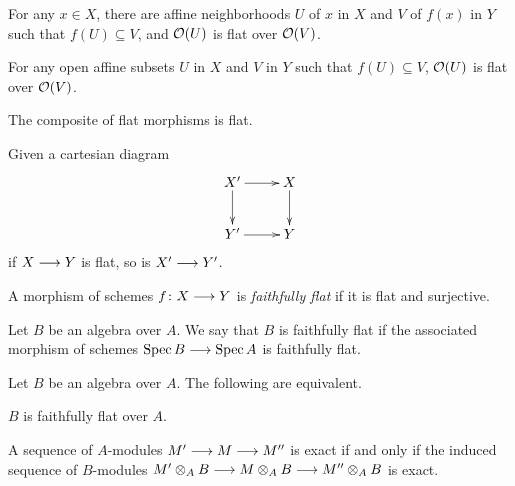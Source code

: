 \begin{1   PRELIMINARY NOTIONS}
\begin{1.1 Algebraic geometry}
\begin{proposition}
\begin{enumeratei}
\item For any $x \in X$, there are affine neighborhoods $U$ of $x$ in $X$ and $V$ of $f(x)$ in $Y$ such that $f(U) \subseteq V$, and $\mathcal{O}(U)$ is flat over $\mathcal{O}(V)$.

\item For any open affine subsets $U$ in $X$ and $V$ in $Y$ such that $f(U) \subseteq V$, $\mathcal{O}(U)$ is flat over $\mathcal{O}(V)$.

\end{enumeratei}
\end{proposition}

\begin{proposition}\hfil

\begin{enumeratei}

\item The composite of flat morphisms is flat.

\item Given a cartesian diagram
   \[
   \xymatrix{
   X'\ar[r]\ar[d] & X\ar[d] \\
   Y' \ar[r] & Y
   }
   \]
if $X \arr Y$ is flat, so is $X' \arr Y'$.
\end{enumeratei}
\end{proposition}

\begin{definition}
A morphism of schemes $f \colon X \arr Y$ is \emph{faithfully flat} if it is flat and surjective.
\end{definition}

Let $B$ be an algebra over $A$. We say that $B$ is faithfully flat if the associated morphism of schemes $\spec B \arr \spec A$ is faithfully flat.

\begin{proposition}

Let $B$ be an algebra over $A$. The following are equivalent.

\begin{enumeratei}

\item $B$ is faithfully flat over $A$.

\item A sequence of $A$-modules $M' \arr M \arr M''$ is exact if and only if the induced sequence of $B$-modules $M' \otimes_A B \arr M \otimes_A B \arr M'' \otimes_A B$  is exact.


\end{enumeratei}
\end{proposition}
\end{1.1 Algebraic geometry}
\end{1   PRELIMINARY NOTIONS}
